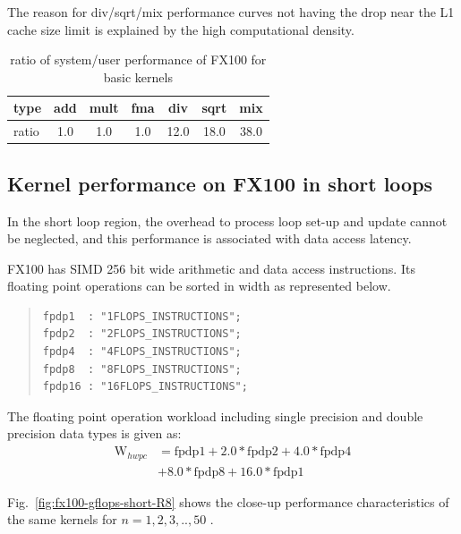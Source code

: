 \documentclass[conference]{IEEEtran}
\begin{document}
The reason for div/sqrt/mix performance curves not having the drop near
the L1 cache size limit is explained by the high computational density.
\begin{table}[b]
\centering
\caption{ratio of system/user performance of FX100 for basic kernels}
\label{tab:ratio-system-user-fx100}
\begin{tabular}{l|c|c|c|c|c|c} \hline
type &	add	&	mult &	fma &	div &	sqrt &	mix \\ \hline
ratio &	1.0 &	1.0 &	1.0 &	12.0 &	18.0 &	38.0 \\ \hline 	
\end{tabular}
\end{table}


\subsection{Kernel performance on FX100 in short loops}
\label{subsection:short-kernels-fx100}

In the short loop region,
the overhead to process loop set-up and update cannot be neglected,
and this performance is associated with data access latency.

FX100 has SIMD 256 bit wide arithmetic and data access instructions.
Its floating point operations can be sorted in width as represented below.
\begin{quote}
\begin{small}
\begin{verbatim}
fpdp1  : "1FLOPS_INSTRUCTIONS";
fpdp2  : "2FLOPS_INSTRUCTIONS";
fpdp4  : "4FLOPS_INSTRUCTIONS";
fpdp8  : "8FLOPS_INSTRUCTIONS";
fpdp16 : "16FLOPS_INSTRUCTIONS";
\end{verbatim}
\end{small}
\end{quote}
The floating point operation workload including single precision
and double precision data types is given as:
\begin{align}
	\mathrm{W}_{hwpc} & = \mathrm{fpdp1} + 2.0*\mathrm{fpdp2} + 4.0*\mathrm{fpdp4} \nonumber \\
			& + 8.0*\mathrm{fpdp8} + 16.0*\mathrm{fpdp1} 
\end{align}

Fig.~\ref{fig:fx100-gflops-short-R8}
shows the close-up performance characteristics of the same kernels for
\begin{math}
n=1,2,3,..,50
\end{math}
.
\end{document}
